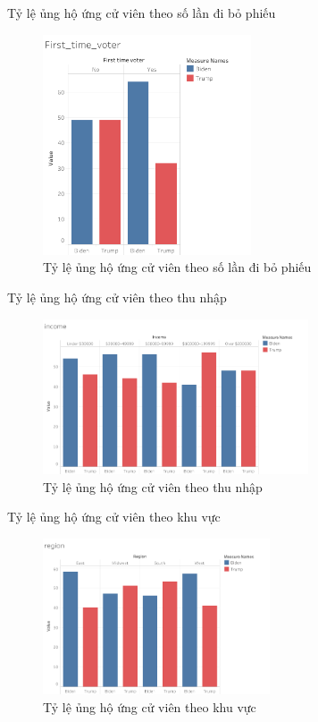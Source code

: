 \documentclass[10pt]{beamer}
\theoremstyle{remark}
\theoremstyle{definition}
\begin{document}
\begin{frame}{Tỷ lệ ủng hộ ứng cử viên theo số lần đi bỏ phiếu}
	\begin{figure}[h!]
        \centering
        \includegraphics[width=0.55\textwidth]{figures/First_time_voter.png}
        \caption{Tỷ lệ ủng hộ ứng cử viên theo số lần đi bỏ phiếu}
    \end{figure}
\end{frame}

\begin{frame}{Tỷ lệ ủng hộ ứng cử viên theo thu nhập}
	\begin{figure}[h!]
        \centering
        \includegraphics[width=0.7\textwidth]{figures/income.png}
        \caption{Tỷ lệ ủng hộ ứng cử viên theo thu nhập}
    \end{figure}
\end{frame}


\begin{frame}{Tỷ lệ ủng hộ ứng cử viên theo khu vực}
	\begin{figure}[h!]
        \centering
        \includegraphics[width=0.6\textwidth]{figures/region.png}
        \caption{Tỷ lệ ủng hộ ứng cử viên theo khu vực}
    \end{figure}
\end{frame}
\end{document}
